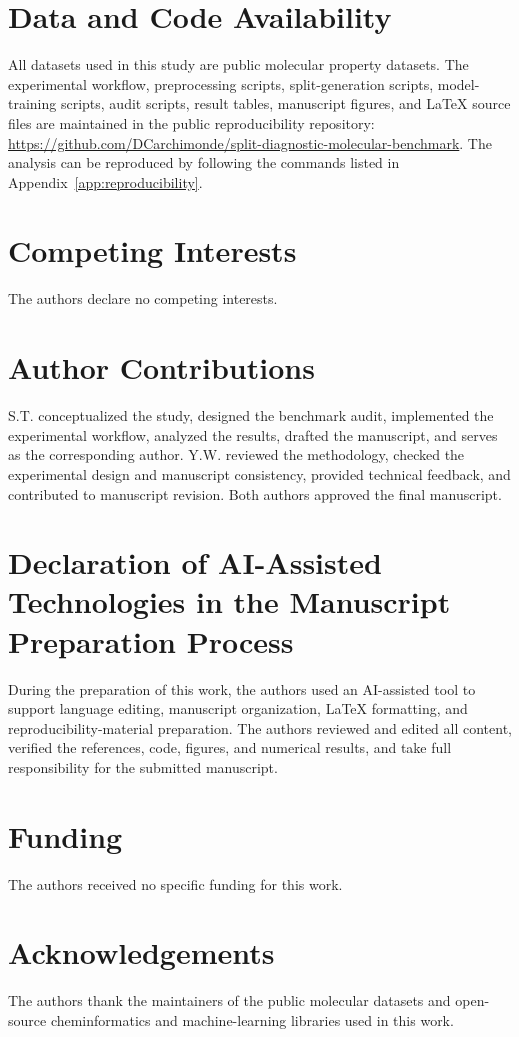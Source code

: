 \section*{Data and Code Availability}

All datasets used in this study are public molecular property datasets. The experimental workflow, preprocessing scripts, split-generation scripts, model-training scripts, audit scripts, result tables, manuscript figures, and LaTeX source files are maintained in the public reproducibility repository: \url{https://github.com/DCarchimonde/split-diagnostic-molecular-benchmark}. The analysis can be reproduced by following the commands listed in Appendix~\ref{app:reproducibility}.

\section*{Competing Interests}

The authors declare no competing interests.

\section*{Author Contributions}

S.T. conceptualized the study, designed the benchmark audit, implemented the experimental workflow, analyzed the results, drafted the manuscript, and serves as the corresponding author. Y.W. reviewed the methodology, checked the experimental design and manuscript consistency, provided technical feedback, and contributed to manuscript revision. Both authors approved the final manuscript.

\section*{Declaration of AI-Assisted Technologies in the Manuscript Preparation Process}

During the preparation of this work, the authors used an AI-assisted tool to support language editing, manuscript organization, LaTeX formatting, and reproducibility-material preparation. The authors reviewed and edited all content, verified the references, code, figures, and numerical results, and take full responsibility for the submitted manuscript.

\section*{Funding}

The authors received no specific funding for this work.

\section*{Acknowledgements}

The authors thank the maintainers of the public molecular datasets and open-source cheminformatics and machine-learning libraries used in this work.
